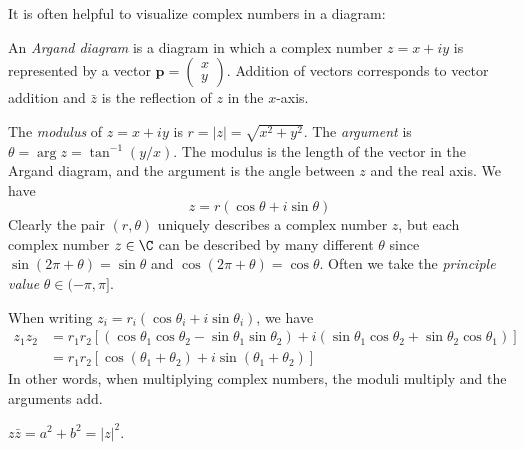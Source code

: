 \documentclass[a4paper]{article}
\begin{document}
It is often helpful to visualize complex numbers in a diagram:
\begin{defi}
  An \emph{Argand diagram} is a diagram in which a complex number $z = x + iy$ is represented by a vector $\mathbf{p}=\begin{pmatrix}x\\y\end{pmatrix}$. Addition of vectors corresponds to vector addition and $\bar{z}$ is the reflection of $z$ in the $x$-axis.
\begin{center}
\end{center}
\end{defi}

\begin{defi}
  The \emph{modulus} of $z = x + iy$ is $r = |z| = \sqrt{x^2 + y^2}$. The \emph{argument} is $\theta = \arg z = \tan^{-1} (y/x)$. The modulus is the length of the vector in the Argand diagram, and the argument is the angle between $z$ and the real axis. We have
  \[
    z = r(\cos\theta + i\sin \theta)
  \]
  Clearly the pair $(r, \theta)$ uniquely describes a complex number $z$, but each complex number $z\in \C$ can be described by many different $\theta$ since $\sin (2\pi + \theta) = \sin \theta$ and $\cos(2\pi + \theta) = \cos\theta$. Often we take the \emph{principle value} $\theta \in (-\pi, \pi]$.
\end{defi}

When writing $z_i = r_i(\cos\theta_i + i\sin \theta_i)$, we have
\begin{align*}
  z_1z_2 &= r_1r_2[(\cos\theta_1\cos\theta_2 - \sin\theta_1\sin\theta_2) + i(\sin\theta_1\cos\theta_2 + \sin\theta_2\cos\theta_1)]\\
  &= r_1r_2[\cos(\theta_1 + \theta_2) + i\sin(\theta_1+\theta_2)]
\end{align*}
In other words, when multiplying complex numbers, the moduli multiply and the arguments add.

\begin{prop}
  $z\bar{z} = a^2 + b^2 = |z|^2$.
\end{prop}
\end{document}
